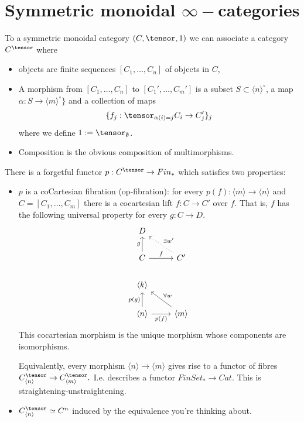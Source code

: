 \section{Symmetric monoidal $\infty-$categories}
To a symmetric monoidal category $(C,\tensor,1)$ we can associate a category $C^\tensor$ where
\begin{itemize}
    \item objects are finite sequences $[C_1,\dots,C_n]$ of objects in $C$,
    \item A morphism from $[C_1,\dots,C_n]$ to $[C_1',\dots,C_m']$ is a subset $S\subset \langle n \rangle^\circ$, a map $\alpha:S\rightarrow \langle m\rangle^\circ\}$ and a collection of maps $$\{f_j:\tensor_{\alpha(i)=j}C_i\rightarrow C_j'\}_j$$ where we define $1:=\tensor_{\emptyset}$.
    \item Composition is the obvious composition of multimorphisms.
\end{itemize}

There is a forgetful functor $p:C^\tensor\rightarrow Fin_*$ which satisfies two properties:
\begin{itemize}
    \item $p$ is a coCartesian fibration (op-fibration): for every $p(f):\langle m\rangle \rightarrow \langle n \rangle$ and $C=[C_1,\dots,C_m]$ there is a cocartesian lift $f:C\rightarrow C'$ over $f$. That is, $f$ has the following universal property for every $g:C\rightarrow D$.
\[\begin{tikzcd}
D                                                      &                                            \\
C \arrow[r, "f"] \arrow[u, "g"]                        & C' \arrow[lu, "\exists w'"', dotted]       \\
\langle k \rangle                                      &                                            \\
\langle n \rangle \arrow[r, "p(f)"'] \arrow[u, "p(g)"] & \langle m \rangle \arrow[lu, "\forall w"']
\end{tikzcd}\]
This cocartesian morphism is the unique morphism whose components are isomorphisms.

Equivalently, every morphism $\langle n \rangle\rightarrow \langle m \rangle$ gives rise to a functor of fibres $C^\tensor_{\langle n \rangle}\rightarrow C^\tensor_{\langle m \rangle}.$ I.e. describes a functor $FinSet_*\rightarrow Cat$. This is straightening-unstraightening.
    \item $C^\tensor_{\langle n \rangle}\simeq C^n$ induced by the equivalence you're thinking about.
\end{itemize}


